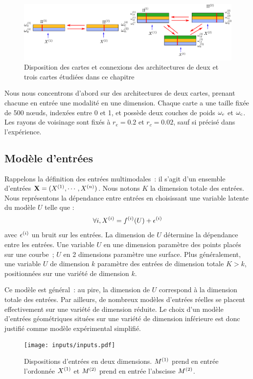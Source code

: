 \documentclass[../main]{subfiles}
\begin{document}
\begin{figure}[t]
	\centering\includegraphics[width=\textwidth]{archis.pdf}
	\caption{Disposition des cartes et connexions des architectures de deux et trois cartes étudiées dans ce chapitre \label{fig:archis}}
\end{figure}

Nous nous concentrons d'abord sur des architectures de deux cartes, prenant chacune en entrée une modalité en une dimension.
Chaque carte a une taille fixée de 500 n\oe{}uds, indexées entre 0 et 1, et possède deux couches de poids $\omega_e$ et $\omega_c$. Les rayons de voisinage sont fixés à $r_e = 0.2$ et $r_c = 0.02$, sauf si précisé dans l'expérience.

\subsection{Modèle d'entrées}

Rappelons la définition des entrées multimodales~: il s'agit d'un ensemble d'entrées $\mathbf{X} = (X^{({1})}, \cdots, X^{({n})})$. Nous notons $K$ la dimension totale des entrées.
Nous représentons la dépendance entre entrées en choisissant une variable latente du modèle $U$ telle que :
$$ \forall i, X^{({i})} = f^{({i})}(U) + \epsilon^{({i})}$$
avec $\epsilon^{({i})}$ un bruit sur les entrées.
La dimension de $U$ détermine la dépendance entre les entrées.
Une variable $U$ en une dimension paramètre des points placés sur une courbe~; $U$ en 2 dimensions paramètre une surface. Plus généralement, une variable $U$ de dimension $k$ paramètre des entrées de dimension totale $K > k$, positionnées sur une variété de dimension $k$.

Ce modèle est général~: au pire, la dimension de $U$ correspond à la dimension totale des entrées. 
Par ailleurs, de nombreux modèles d'entrées réelles se placent effectivement sur une variété de dimension réduite. Le choix d'un modèle d'entrées géométriques situées sur une variété de dimension inférieure est donc justifié comme modèle expérimental simplifié.

\begin{figure}[ht]
	\texttt{[image: inputs/inputs.pdf]}
	\caption{Dispositions d'entrées en deux dimensions. $M^{({1})}$ prend en entrée l'ordonnée $X^{({1})}$ et $M^{({2})}$ prend en entrée l'abscisse $M^{({2})}$. \label{fig:input_list}}
\end{figure}
\end{document}
